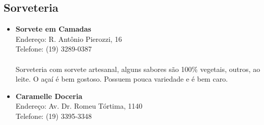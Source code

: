 \subsection{Sorveteria}

\begin{itemize}
\item \textbf{Sorvete em Camadas}
  \\Endereço: R. Antônio Pierozzi, 16
  \\Telefone: (19) 3289-0387
  \\
  \\Sorveteria com sorvete artesanal, alguns sabores são 100\% vegetais,
  outros, ao leite. O açaí é bem gostoso. Possuem pouca variedade e é bem
  caro.
\item \textbf{Caramelle Doceria}
  \\Endereço: Av. Dr. Romeu Tórtima, 1140
  \\Telefone: (19) 3395-3348
\end{itemize}
